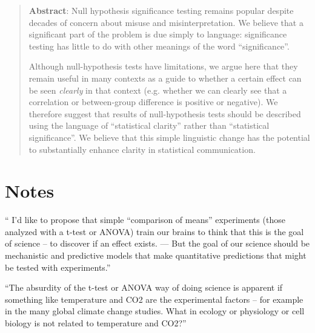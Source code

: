 \begin{abstract}

\textbf{Abstract}: Null hypothesis significance testing remains popular despite decades of concern about misuse and misinterpretation.
We believe that a significant  part of the problem is due simply to language: significance testing has little to do with other meanings of the word ``significance''. 

Although null-hypothesis tests have limitations, we argue here that they remain useful in many contexts as a guide to whether a certain effect can be seen \emph{clearly} in that context (e.g.
whether we can clearly see that a correlation or between-group difference is positive or negative).
We therefore suggest that results of null-hypothesis tests should be described using the language of ``statistical clarity'' rather than ``statistical significance''.
We believe that this simple linguistic change has the potential to substantially enhance clarity in statistical communication.

\end{abstract}

\flushbottom
\maketitle
\newpage
\thispagestyle{empty}

\section*{Notes}


`` I’d like to propose that simple “comparison of means” experiments (those analyzed with a t-test or ANOVA) train our brains to think that this is the goal of science – to discover if an effect exists. --- But the goal of our science should be mechanistic and predictive models that make quantitative predictions that might be tested with experiments.'' 

``The absurdity of the t-test or  ANOVA way of doing science is apparent if something like temperature and CO2 are the experimental factors – for example in the many global climate change studies. What in ecology or physiology or cell biology is not related to temperature and CO2?''

